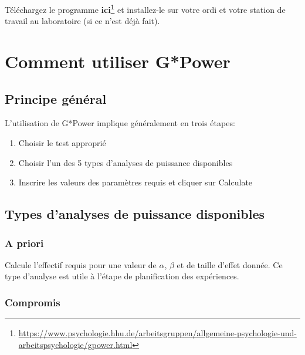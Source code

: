 \documentclass[12pt,]{book}
\makeatletter
\providecommand{\tightlist}{%
  \setlength{\itemsep}{0pt}\setlength{\parskip}{0pt}}
\renewcommand{\href}[2]{#2\footnote{\url{#1}}}
\newenvironment{kframe}{%
\medskip{}
\setlength{\fboxsep}{.8em}
 \def\at@end@of@kframe{}%
 \ifinner\ifhmode%
  \def\at@end@of@kframe{\end{minipage}}%
  \begin{minipage}{\columnwidth}%
 \fi\fi%
 \def\FrameCommand##1{\hskip\@totalleftmargin \hskip-\fboxsep
 \colorbox{shadecolor}{##1}\hskip-\fboxsep
     \hskip-\linewidth \hskip-\@totalleftmargin \hskip\columnwidth}%
 \MakeFramed {\advance\hsize-\width
   \@totalleftmargin\z@ \linewidth\hsize
   \@setminipage}}%
 {\par\unskip\endMakeFramed%
 \at@end@of@kframe}
\newenvironment{rmdblock}[1]
  {
  \begin{itemize}
  \renewcommand{\labelitemi}{
    \raisebox{-.7\height}[0pt][0pt]{
      {\setkeys{Gin}{width=3em,keepaspectratio}\texttt{[image: images/\#1]}}
    }
  }
  \setlength{\fboxsep}{1em}
  \begin{kframe}
  \item
  }
  {
  \end{kframe}
  \end{itemize}
  }
\newenvironment{rmdcode}
  {\begin{rmdblock}{screen}}
  {\end{rmdblock}}
\makeatother
\begin{document}
\begin{rmdcode}
Téléchargez le programme \textbf{\href{https://www.psychologie.hhu.de/arbeitsgruppen/allgemeine-psychologie-und-arbeitspsychologie/gpower.html}{ici}} et installez-le sur votre ordi et votre station de travail au laboratoire (si ce n'est déjà fait).
\end{rmdcode}

\hypertarget{comment-utiliser-gpower}{%
\section{Comment utiliser G*Power}\label{comment-utiliser-gpower}}

\hypertarget{principe-guxe9nuxe9ral}{%
\subsection{Principe général}\label{principe-guxe9nuxe9ral}}

L'utilisation de G*Power implique généralement en trois étapes:

\begin{enumerate}
\def\labelenumi{\arabic{enumi}.}
\tightlist
\item
  Choisir le test approprié
\item
  Choisir l'un des 5 types d'analyses de puissance disponibles
\item
  Inscrire les valeurs des paramètres requis et cliquer sur Calculate
\end{enumerate}

\hypertarget{types-danalyses-de-puissance-disponibles}{%
\subsection{Types d'analyses de puissance disponibles}\label{types-danalyses-de-puissance-disponibles}}

\hypertarget{a-priori}{%
\subsubsection*{A priori}\label{a-priori}}

Calcule l'effectif requis pour une valeur de \(\alpha\), \(\beta\) et de taille d'effet donnée.
Ce type d'analyse est utile à l'étape de planification des expériences.

\hypertarget{compromis}{%
\subsubsection*{Compromis}\label{compromis}}
\end{document}
